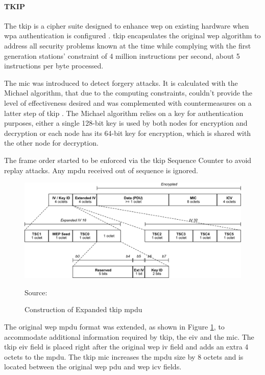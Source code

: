 \paragraph{TKIP}

The \gls{tkip} is a cipher suite designed to enhance \gls{wep} on existing hardware when \gls{wpa} authentication is configured \cite{ieee_80211_2020}. \gls{tkip} encapsulates the original \gls{wep} algorithm to address all security problems known at the time while complying with the first generation stations' constraint of 4 million instructions per second, about 5 instructions per byte processed.

The \gls{mic} was introduced to detect forgery attacks. It is calculated with the Michael algorithm, that due to the computing constraints, couldn't provide the level of effectiveness desired and was complemented with countermeasures on a latter step of \gls{tkip} \cite{ieee_80211_2020}. The Michael algorithm relies on a key for authentication purposes, either a single 128-bit key is used by both nodes for encryption and decryption or each node has its 64-bit key for encryption, which is shared with the other node for decryption.

The frame order started to be enforced via the \gls{tkip} Sequence Counter to avoid replay attacks. Any \gls{mpdu} received out of sequence is ignored.

\begin{figure}[h]
    \centering
    \includegraphics[width=\linewidth]{contents/background-in-wireless-networks/protected-network-standards/wpa/tkip/construction-of-expanded-tkip-mpdu.png}
    \caption{Construction of Expanded \gls{tkip} \gls{mpdu}}
    {Source: \cite{ieee_80211_2020}}
    \label{figure:ieee80211_figure43e}
\end{figure}

The original \gls{wep} \gls{mpdu} format was extended, as shown in Figure \ref{figure:ieee80211_figure43e}, to accommodate additional information required by \gls{tkip}, the \gls{eiv} and the \gls{mic}. The \gls{tkip} \gls{eiv} field is placed right after the original \gls{wep} \gls{iv} field and adds an extra 4 octets to the \gls{mpdu}. The \gls{tkip} \gls{mic} increases the \gls{mpdu} size by 8 octets and is located between the original \gls{wep} \gls{pdu} and \gls{wep} \gls{icv} fields.

